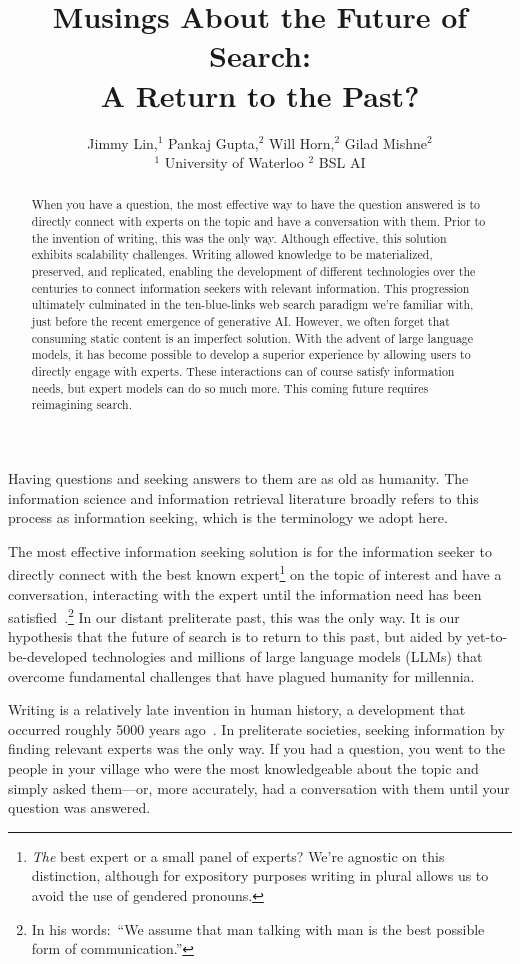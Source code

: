 \documentclass{article}
\title{Musings About the Future of Search:\\ A Return to the Past?}
\author{Jimmy Lin,$^{1}$ Pankaj Gupta,$^{2}$ Will Horn,$^{2}$  Gilad Mishne$^{2}$ \\[1ex]
$^{1}$ University of Waterloo \qquad $^{2}$ BSL AI
}
\begin{document}
\maketitle

\begin{abstract}
When you have a question, the most effective way to have the question answered is to directly connect with experts on the topic and have a conversation with them.
Prior to the invention of writing, this was the only way.
Although effective, this solution exhibits scalability challenges.
Writing allowed knowledge to be materialized, preserved, and replicated, enabling the development of different technologies over the centuries to connect information seekers with relevant information.
This progression ultimately culminated in the ten-blue-links web search paradigm we're familiar with, just before the recent emergence of generative AI.
However, we often forget that consuming static content is an imperfect solution.
With the advent of large language models, it has become possible to develop a superior experience by allowing users to directly engage with experts.
These interactions can of course satisfy information needs, but expert models can do so much more.
This coming future requires reimagining search.
\end{abstract}

Having questions and seeking answers to them are as old as humanity.
The information science and information retrieval literature broadly refers to this process as information seeking, which is the terminology we adopt here.

The most effective information seeking solution is for the information seeker to directly connect with the best known expert\footnote{{\it The} best expert or a small panel of experts? We're agnostic on this distinction, although for expository purposes writing in plural allows us to avoid the use of gendered pronouns.} on the topic of interest and have a conversation, interacting with the expert until the information need has been satisfied~\citep{Taylor62}.\footnote{In his words:\ ``We assume that man talking with man is the best possible form of communication.''}
In our distant preliterate past, this was the only way.
It is our hypothesis that the future of search is to return to this past, but aided by yet-to-be-developed technologies and millions of large language models (LLMs) that overcome fundamental challenges that have plagued humanity for millennia.

Writing is a relatively late invention in human history, a development that occurred roughly 5000 years ago~\citep{Robinson_1995}.
In preliterate societies, seeking information by finding relevant experts was the only way.
If you had a question, you went to the people in your village who were the most knowledgeable about the topic and simply asked them---or, more accurately, had a conversation with them until your question was answered.
\end{document}
